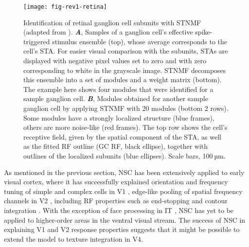 \begin{figure}[ht]
	\centering
	\texttt{[image: fig-rev1-retina]}
    \caption{
    Identification of retinal ganglion cell subunits 
    with \ac{STNMF} (adapted  from \cite{Liu2017}).
    \textbf{\emph{A}},
	     Samples of a ganglion cell’s effective spike-triggered stimulus ensemble (top),
         whose average corresponds to the cell’s \ac{STA}.
         For easier visual comparison with the subunits,
         \acp{STA} are displayed with negative pixel values set to zero and
         with zero corresponding to white in the grayscale image.
         \ac{STNMF} decomposes this ensemble into a set of modules and 
         a weight matrix (bottom).
         The example here shows four modules that were identified for
         a sample ganglion cell.
    \textbf{\emph{B}},
         Modules obtained for another sample ganglion cell by applying \ac{STNMF}
         with 20 modules (bottom 2 rows). Some modules have a strongly localized structure 
         (blue frames), others are more noise-like (red frames). 
         The top row shows the cell’s receptive field,
         given by the spatial component of the STA, as well as the fitted \ac{RF} outline
         (GC RF, black ellipse), together with outlines of the localized subunits 
         (blue ellipses). Scale bars, 100 µm.
    }
	\label{fig:NMF|retina}
\end{figure}

As mentioned in the previous section,
\ac{NSC} has been extensively applied to early visual cortex,
where it has successfully explained 
orientation and frequency tuning of simple and complex cells in \ac{V1} \cite{Hoyer2003},
edge-like pooling of spatial frequency channels in V2 \cite{Hyvarinen2005},
including \ac{RF} properties such as end-stopping and contour integration 
\cite{HoyerHyvarinen2002}.
With the exception of face processing in \ac{IT}
\cite{LeeSeung1999,ChangTsao2017},
\ac{NSC} has yet to be applied to higher-order areas in the ventral visual stream.
The success of \ac{NSC} in explaining V1 and V2 response properties
suggests that it might be possible to extend the model to texture integration in
V4.


